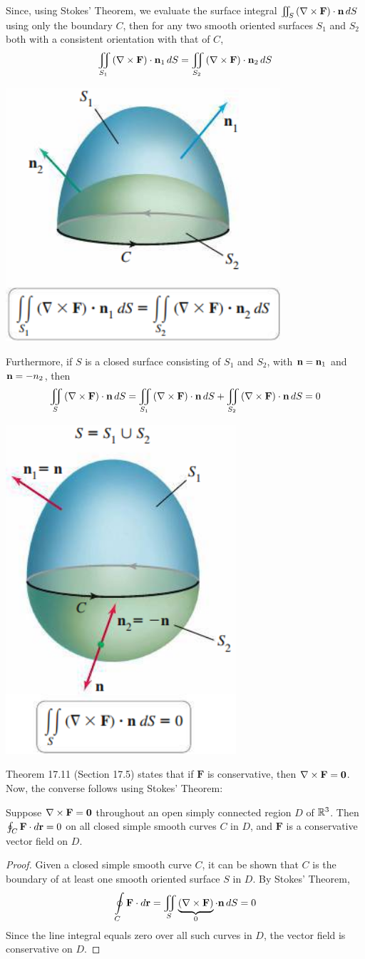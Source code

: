 \documentclass[mathNotesPreamble]{subfiles}
\begin{document}
  \noindent
  Since, using Stokes' Theorem, we evaluate the surface integral $\iint_S {\left(\nabla\times\mathbf F\right)}\cdot{\mathbf{n}}\,dS$ using only the boundary $C$, then for any two smooth oriented surfaces $S_1$ and $S_2$ both with a consistent orientation with that of $C$,
    \[\iint\limits_{S_1}{\left(\nabla\times\mathbf F\right)}\cdot{\mathbf{n}}_1\,dS=\iint\limits_{S_2}{\left(\nabla\times\mathbf F\right)}\cdot{\mathbf{n}}_2\,dS\]
  \begin{center}
    \includegraphics[width=0.28\linewidth]{images/briggs_17_07/fig17_67a}
    \hspace*{10pt}
  \end{center}

  \noindent
  Furthermore, if $S$ is a closed surface consisting of $S_1$ and $S_2$, with ${\mathbf{n}}={\mathbf{n}}_1$ and ${\mathbf{n}}=-n_2$, then 
    \[\iint\limits_S {\left(\nabla\times\mathbf F\right)}\cdot{\mathbf{n}}\,dS=\iint\limits_{S_1}{\left(\nabla\times\mathbf F\right)}\cdot{\mathbf{n}}\,dS+\iint\limits_{S_2}{\left(\nabla\times\mathbf F\right)}\cdot{\mathbf{n}}\,dS=0\]
  \begin{center}
    \includegraphics[width=0.28\linewidth]{images/briggs_17_07/fig17_67b}
  \end{center}
  \pagebreak

  \noindent
  Theorem 17.11 (Section 17.5) states that if $\mathbf F$ is conservative, then $\nabla\times\mathbf F=\mathbf{0}$. Now, the converse follows using Stokes' Theorem:

  \begin{thmBox*}[Theorem 17.16: Curl $\mathbf F=\bfO$ implies $\mathbf F$ Is Conservative]
    Suppose $\nabla\times\mathbf F=\mathbf{0}$ throughout an open simply connected region $D$ of $\mathbb{R}^3$. Then $\oint_C\mathbf F\cdot d{\mathbf{r}}=0$ on all closed simple smooth curves $C$ in $D$, and $\mathbf F$ is a conservative vector field on $D$.
  \end{thmBox*}
  \begin{proof}
    Given a closed simple smooth curve $C$, it can be shown that $C$ is the boundary of at least one smooth oriented surface $S$ in $D$. By Stokes' Theorem,
      \[\oint\limits_C \mathbf F\cdot d{\mathbf{r}}=\iint\limits_S \underbrace{{\left(\nabla\times\mathbf F\right)}}_{0}\cdot{\mathbf{n}}\,dS=0\]
    Since the line integral equals zero over all such curves in $D$, the vector field is conservative on $D$.
  \end{proof}

  \pagebreak
  
\end{document}
